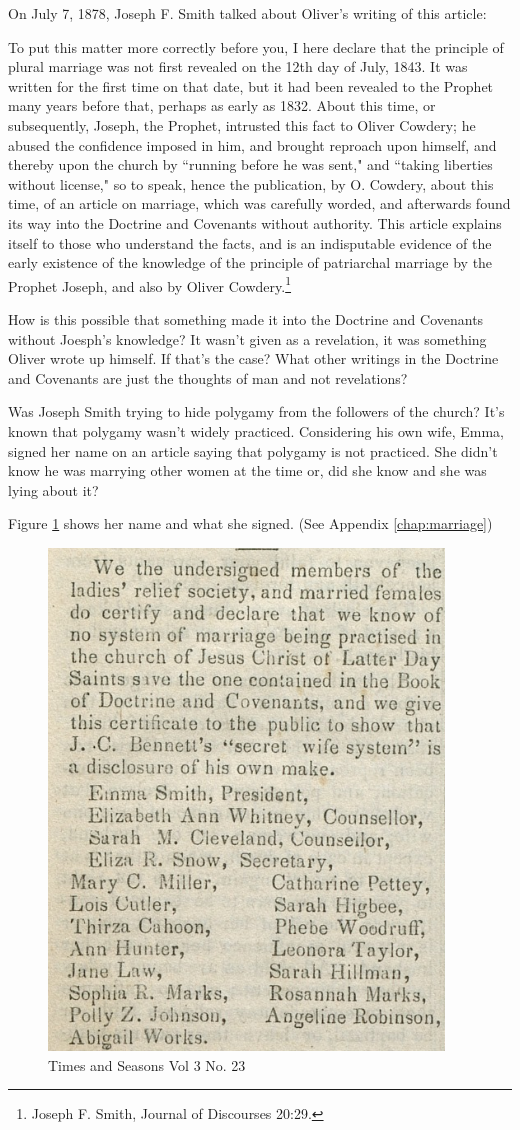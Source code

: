 On July 7, 1878, Joseph F. Smith talked about Oliver's writing of this article:

\begin{displayquote}
To put this matter more correctly before you, I here declare that the principle of 
plural marriage was not first revealed on the 12th day of July, 1843. It was 
written for the first time on that date, but it had been revealed to the Prophet 
many years before that, perhaps as early as 1832. About this time, or 
subsequently, Joseph, the Prophet, intrusted this fact to Oliver Cowdery; he 
abused the confidence imposed in him, and brought reproach upon himself, and 
thereby upon the church by ``running before he was sent," and ``taking liberties 
without license," so to speak, hence the publication, by O. Cowdery, about this 
time, of an article on marriage, which was carefully worded, and afterwards found 
its way into the Doctrine and Covenants without authority. This article explains 
itself to those who understand the facts, and is an indisputable evidence of the 
early existence of the knowledge of the principle of patriarchal marriage by the 
Prophet Joseph, and also by Oliver Cowdery.\footnote{Joseph F. Smith, Journal of 
Discourses 20:29.}
\end{displayquote}

How is this possible that something made it into the Doctrine and Covenants without
Joesph's knowledge? It wasn't given as a revelation, it was something Oliver wrote up
himself. If that's the case? What other writings in the Doctrine and Covenants are
just the thoughts of man and not revelations?

Was Joseph Smith trying to hide polygamy from the followers of the church? It's known
that polygamy wasn't widely practiced. Considering his own wife, Emma, signed her
name on an article saying that polygamy is not practiced. She didn't know he was
marrying other women at the time or, did she know and she was lying about it?

Figure \ref{fig:tas1} shows her name and what she signed. (See Appendix
\ref{chap:marriage})

\begin{figure}[h!]
  \centering
  \includegraphics[width=0.4\linewidth]{articles/images/polygamy.png}
  \caption{Times and Seasons Vol 3 No. 23}
  \label{fig:tas1}
\end{figure}

